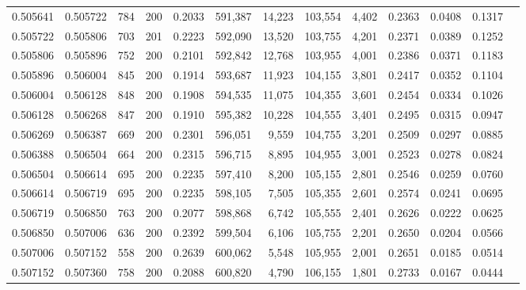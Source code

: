 \begin{tabular}{rrrrrrrrrrrrr}
0.505641 & 0.505722 &   784 & 200 &                                     0.2033 & 591,387 &  14,223 & 103,554 &   4,402 & 0.2363 & 0.0408 & 0.1317 \\
0.505722 & 0.505806 &   703 & 201 &                                     0.2223 & 592,090 &  13,520 & 103,755 &   4,201 & 0.2371 & 0.0389 & 0.1252 \\
0.505806 & 0.505896 &   752 & 200 &                                     0.2101 & 592,842 &  12,768 & 103,955 &   4,001 & 0.2386 & 0.0371 & 0.1183 \\
0.505896 & 0.506004 &   845 & 200 &                                     0.1914 & 593,687 &  11,923 & 104,155 &   3,801 & 0.2417 & 0.0352 & 0.1104 \\
0.506004 & 0.506128 &   848 & 200 &                                     0.1908 & 594,535 &  11,075 & 104,355 &   3,601 & 0.2454 & 0.0334 & 0.1026 \\
0.506128 & 0.506268 &   847 & 200 &                                     0.1910 & 595,382 &  10,228 & 104,555 &   3,401 & 0.2495 & 0.0315 & 0.0947 \\
0.506269 & 0.506387 &   669 & 200 &                                     0.2301 & 596,051 &   9,559 & 104,755 &   3,201 & 0.2509 & 0.0297 & 0.0885 \\
0.506388 & 0.506504 &   664 & 200 &                                     0.2315 & 596,715 &   8,895 & 104,955 &   3,001 & 0.2523 & 0.0278 & 0.0824 \\
0.506504 & 0.506614 &   695 & 200 &                                     0.2235 & 597,410 &   8,200 & 105,155 &   2,801 & 0.2546 & 0.0259 & 0.0760 \\
0.506614 & 0.506719 &   695 & 200 &                                     0.2235 & 598,105 &   7,505 & 105,355 &   2,601 & 0.2574 & 0.0241 & 0.0695 \\
0.506719 & 0.506850 &   763 & 200 &                                     0.2077 & 598,868 &   6,742 & 105,555 &   2,401 & 0.2626 & 0.0222 & 0.0625 \\
0.506850 & 0.507006 &   636 & 200 &                                     0.2392 & 599,504 &   6,106 & 105,755 &   2,201 & 0.2650 & 0.0204 & 0.0566 \\
0.507006 & 0.507152 &   558 & 200 &                                     0.2639 & 600,062 &   5,548 & 105,955 &   2,001 & 0.2651 & 0.0185 & 0.0514 \\
0.507152 & 0.507360 &   758 & 200 &                                     0.2088 & 600,820 &   4,790 & 106,155 &   1,801 & 0.2733 & 0.0167 & 0.0444 \\

\end{tabular}
